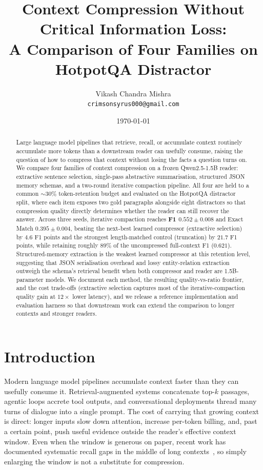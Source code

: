 \documentclass[10pt,twocolumn]{article}
\title{Context Compression Without Critical Information Loss:\\A Comparison of Four Families on HotpotQA Distractor}
\author[1]{Vikash Chandra Mishra\\\texttt{crimsonsyrus000@gmail.com}}
\affil[1]{Independent}
\date{\today}
\begin{document}
\maketitle

\begin{abstract}
Large language model pipelines that retrieve, recall, or accumulate context routinely accumulate more tokens than a downstream reader can usefully consume, raising the question of how to compress that context without losing the facts a question turns on. We compare four families of context compression on a frozen Qwen2.5-1.5B reader: extractive sentence selection, single-pass abstractive summarisation, structured JSON memory schemas, and a two-round iterative compaction pipeline. All four are held to a common $\sim$30\% token-retention budget and evaluated on the HotpotQA distractor split, where each item exposes two gold paragraphs alongside eight distractors so that compression quality directly determines whether the reader can still recover the answer. Across three seeds, iterative compaction reaches \textbf{F1 $0.552 \pm 0.008$} and Exact Match $0.395 \pm 0.004$, beating the next-best learned compressor (extractive selection) by $4.6$ F1 points and the strongest length-matched control (truncation) by $21.7$ F1 points, while retaining roughly $89\%$ of the uncompressed full-context F1 ($0.621$). Structured-memory extraction is the weakest learned compressor at this retention level, suggesting that JSON serialisation overhead and lossy entity-relation extraction outweigh the schema's retrieval benefit when both compressor and reader are 1.5B-parameter models. We document each method, the resulting quality-vs-ratio frontier, and the cost trade-offs (extractive selection captures most of the iterative-compaction quality gain at $12\times$ lower latency), and we release a reference implementation and evaluation harness so that downstream work can extend the comparison to longer contexts and stronger readers.
\end{abstract}

\section{Introduction}
\label{sec:introduction}

Modern language model pipelines accumulate context faster than they can usefully consume it. Retrieval-augmented systems concatenate top-$k$ passages, agentic loops accrete tool outputs, and conversational deployments thread many turns of dialogue into a single prompt. The cost of carrying that growing context is direct: longer inputs slow down attention, increase per-token billing, and, past a certain point, push useful evidence outside the reader's effective context window. Even when the window is generous on paper, recent work has documented systematic recall gaps in the middle of long contexts~\cite{liu2023lostmiddle}, so simply enlarging the window is not a substitute for compression.
\end{document}

